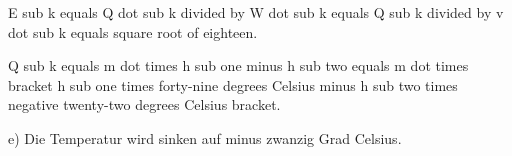 E sub k equals Q dot sub k divided by W dot sub k equals Q sub k divided by v dot sub k equals square root of eighteen.

Q sub k equals m dot times h sub one minus h sub two equals m dot times bracket h sub one times forty-nine degrees Celsius minus h sub two times negative twenty-two degrees Celsius bracket.

e) Die Temperatur wird sinken auf minus zwanzig Grad Celsius.
